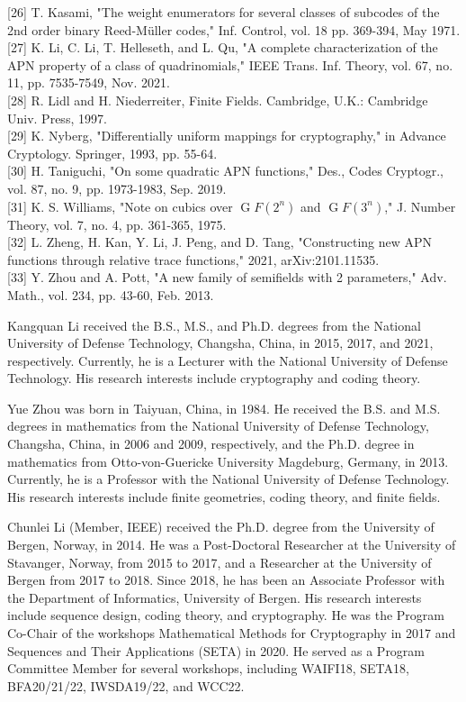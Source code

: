 \documentclass[10pt]{article}
\begin{document}
[26] T. Kasami, "The weight enumerators for several classes of subcodes of the 2nd order binary Reed-Müller codes," Inf. Control, vol. 18 pp. 369-394, May 1971.\\[0pt]
[27] K. Li, C. Li, T. Helleseth, and L. Qu, "A complete characterization of the APN property of a class of quadrinomials," IEEE Trans. Inf. Theory, vol. 67, no. 11, pp. 7535-7549, Nov. 2021.\\[0pt]
[28] R. Lidl and H. Niederreiter, Finite Fields. Cambridge, U.K.: Cambridge Univ. Press, 1997.\\[0pt]
[29] K. Nyberg, "Differentially uniform mappings for cryptography," in Advance Cryptology. Springer, 1993, pp. 55-64.\\[0pt]
[30] H. Taniguchi, "On some quadratic APN functions," Des., Codes Cryptogr., vol. 87, no. 9, pp. 1973-1983, Sep. 2019.\\[0pt]
[31] K. S. Williams, "Note on cubics over $\operatorname{G} F\left(2^{n}\right)$ and $\operatorname{G} F\left(3^{n}\right)$," J. Number Theory, vol. 7, no. 4, pp. 361-365, 1975.\\[0pt]
[32] L. Zheng, H. Kan, Y. Li, J. Peng, and D. Tang, "Constructing new APN functions through relative trace functions," 2021, arXiv:2101.11535.\\[0pt]
[33] Y. Zhou and A. Pott, "A new family of semifields with 2 parameters," Adv. Math., vol. 234, pp. 43-60, Feb. 2013.

Kangquan Li received the B.S., M.S., and Ph.D. degrees from the National University of Defense Technology, Changsha, China, in 2015, 2017, and 2021, respectively. Currently, he is a Lecturer with the National University of Defense Technology. His research interests include cryptography and coding theory.

Yue Zhou was born in Taiyuan, China, in 1984. He received the B.S. and M.S. degrees in mathematics from the National University of Defense Technology, Changsha, China, in 2006 and 2009, respectively, and the Ph.D. degree in mathematics from Otto-von-Guericke University Magdeburg, Germany, in 2013. Currently, he is a Professor with the National University of Defense Technology. His research interests include finite geometries, coding theory, and finite fields.

Chunlei Li (Member, IEEE) received the Ph.D. degree from the University of Bergen, Norway, in 2014. He was a Post-Doctoral Researcher at the University of Stavanger, Norway, from 2015 to 2017, and a Researcher at the University of Bergen from 2017 to 2018. Since 2018, he has been an Associate Professor with the Department of Informatics, University of Bergen. His research interests include sequence design, coding theory, and cryptography. He was the Program Co-Chair of the workshops Mathematical Methods for Cryptography in 2017 and Sequences and Their Applications (SETA) in 2020. He served as a Program Committee Member for several workshops, including WAIFI18, SETA18, BFA20/21/22, IWSDA19/22, and WCC22.
\end{document}
